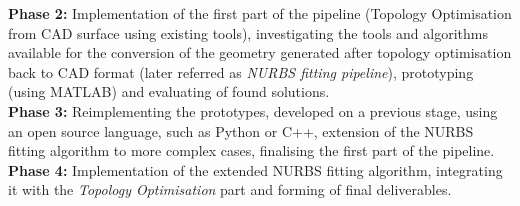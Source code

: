 \textbf{Phase 2:} Implementation of the first part of the pipeline (Topology Optimisation from CAD surface using existing tools), investigating the tools and algorithms available for the conversion of the geometry generated after topology optimisation back to CAD format (later referred as \textit{NURBS fitting pipeline}), prototyping (using MATLAB) and evaluating of found solutions.\\

\textbf{Phase 3:} Reimplementing the prototypes, developed on a previous stage, using an open source language, such as Python or C++, extension of the NURBS fitting algorithm to more complex cases, finalising the first part of the pipeline.\\

\textbf{Phase 4:} Implementation of the extended NURBS fitting algorithm, integrating it with the \textit{Topology Optimisation} part and forming of final deliverables.

